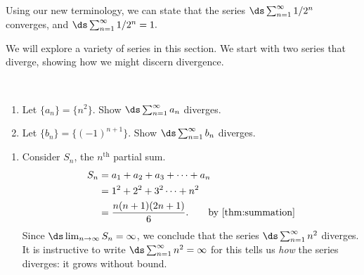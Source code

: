 Using our new terminology, we can state that the series $\ds \sum_{n=1}^\infty 1/2^n$\vspace{-.5\baselineskip} converges, and $\ds \sum_{n=1}^\infty 1/2^n = 1.$


We will explore a variety of series in this section. We start with two series that diverge, showing how we might discern divergence.

\begin{example}\label{ex_series1}
\mbox{}\\[-2\baselineskip]\parbox[t]{\linewidth}{%
\begin{enumerate}
\item		Let $\{a_n\} = \{n^2\}$. Show $\ds \sum_{n=1}^\infty a_n$ diverges.
\item		Let $\{b_n\} = \{(-1)^{n+1}\}$. Show $\ds \sum_{n=1}^\infty b_n$ diverges.
\end{enumerate}}\vspace{0pt}
\solution
\begin{enumerate}
\item	Consider $S_n$, the $n^\text{th}$ partial sum.
%
%
\begin{align*}
	S_n &= a_1+a_2+a_3+\dotsb+a_n \\		
	&= 1^2+2^2+3^2\dotsb+ n^2 \\
	&= \frac{n(n+1)(2n+1)}{6}. \qquad\text{by \autoref{thm:summation}}
\end{align*}
Since $\ds \lim_{n\to\infty}S_n = \infty$, we conclude that the series $\ds \sum_{n=1}^\infty n^2$ diverges. It is instructive to write $\ds \sum_{n=1}^\infty n^2=\infty$ for this tells us \emph{how} the series diverges: it grows without bound.


\end{enumerate}
\end{example}
